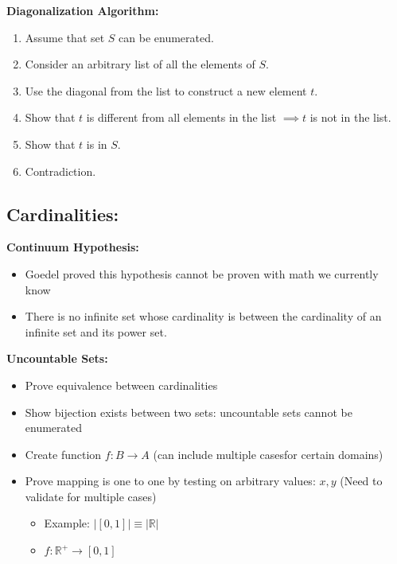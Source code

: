 \documentclass{article}\usepackage{amsmath,amssymb,amsthm,tikz,tkz-graph,color,chngpage,soul,hyperref,csquotes,graphicx,floatrow, listings}\newcommand*{\QEDB}{\hfill\ensuremath{\square}}\newtheorem*{prop}{Proposition}\renewcommand{\theenumi}{\alph{enumi}}\usepackage[shortlabels]{enumitem}\usepackage[nobreak=true]{mdframed}\usetikzlibrary{matrix,calc}\MakeOuterQuote{"}\usepackage[margin=0.75in]{geometry} \newtheorem{theorem}{Theorem}\newcommand{\Z}{\mathbb Z}\newcommand{\R}{\mathbb R}\newcommand{\Q}{\mathbb Q}\newcommand{\N}{\mathbb N}
\begin{document}
\begin{mdframed}
\textbf{Diagonalization Algorithm:}
    \begin{enumerate}[1.]
        \item Assume that set $S$ can be enumerated.
        \item Consider an arbitrary list of all the elements of $S$.
        \item Use the diagonal from the list to construct a new element $t$.
        \item Show that $t$ is different from all elements in the list $\implies t$ is not in the list.
        \item Show that $t$ is in $S$.
        \item Contradiction.
    \end{enumerate}
\end{mdframed}

\subsection*{Cardinalities:}
\begin{mdframed}
\textbf{Continuum Hypothesis:}
\begin{itemize}
    \item Goedel proved this hypothesis cannot be proven with math we currently know
    \item There is no infinite set whose cardinality is between the cardinality of an infinite set and its power set.
\end{itemize}
\end{mdframed}
\pagebreak

\textbf{Uncountable Sets:}
\begin{itemize}
    \item Prove equivalence between cardinalities
    \item Show bijection exists between two sets: uncountable sets cannot be enumerated
    \item Create function $f: B \rightarrow A$ (can include multiple casesfor certain domains)
    \item Prove mapping is one to one by testing on arbitrary values: $x, y$ (Need to validate for multiple cases)
    \begin{itemize}
        \item Example: $|[0,1]| \equiv |\R|$
        \item $f: \R^+ \rightarrow [0,1]$
    \end{itemize}
\end{itemize}
\end{document}
